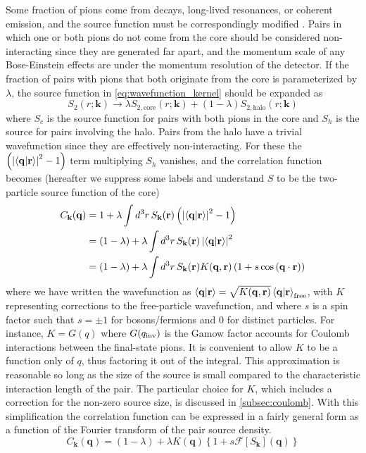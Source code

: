 Some fraction of pions come from decays, long-lived resonances, or coherent emission, and the source function must be correspondingly modified \cite{Bowler:1991vx,Sinyukov:1998fc}.
Pairs in which one or both pions do not come from the core should be considered non-interacting since they are generated far apart, and the momentum scale of any Bose-Einstein effects are under the momentum resolution of the detector.
If the fraction of pairs with pions that both originate from the core is parameterized by $\lambda$, the source function in \cref{eq:wavefunction_kernel} should be expanded as
\begin{equation} S_{2}(r;\mathbf{k}) \rightarrow \lambda S_{2,\textrm{core}} (r;\mathbf{k}) + (1-\lambda) S_{2,\textrm{halo}} (r;\mathbf{k}) \end{equation}
where $S_c$ is the source function for pairs with both pions in the core and $S_h$ is the source for pairs involving the halo.
Pairs from the halo have a trivial wavefunction since they are effectively non-interacting.
For these the $\left(\left|\braket{\mathbf{q}|\mathbf{r}}\right|^2 - 1\right)$ term multiplying $S_h$ vanishes, and the correlation function becomes (hereafter we suppress some labels and understand $S$ to be the two-particle source function of the core)
\begin{equation}
  \begin{split}
    C_\mathbf{k}(\mathbf{q}) &= 1 + \lambda \int d^3 r \, S_{\mathbf{k}}(\mathbf{r}) \left(\left|\braket{\mathbf{q}|\mathbf{r}}\right|^2 - 1 \right)\\
    &= (1-\lambda) + \lambda \int d^3 r \, S_{\mathbf{k}}(\mathbf{r}) \left|\braket{\mathbf{q}|\mathbf{r}}\right|^2\\
    &= (1-\lambda) + \lambda \int d^3 r \, S_{\mathbf{k}}(\mathbf{r}) K(\mathbf{q},\mathbf{r}) \left(1 + s \cos\left(\mathbf{q}\cdot\mathbf{r}\right)\right)
  \end{split}
\end{equation}
where we have written the wavefunction as $\braket{\mathbf{q}|\mathbf{r}} = \sqrt{K(\mathbf{q},\mathbf{r})} \braket{\mathbf{q}|\mathbf{r}}_{\textrm{free}}$, with $K$ representing corrections to the free-particle wavefunction, and where $s$ is a spin factor such that $s = \pm 1$ for bosons/fermions and $0$ for distinct particles.
For instance, $K = G(q)$ where $G(q_{\mathrm{inv}})$ is the Gamow factor accounts for Coulomb interactions between the final-state pions.
It is convenient to allow $K$ to be a function only of $q$, thus factoring it out of the integral.
This approximation is reasonable so long as the size of the source is small compared to the characteristic interaction length of the pair.
The particular choice for $K$, which includes a correction for the non-zero source size, is discussed in \cref{subsec:coulomb}.
With this simplification the correlation function can be expressed in a fairly general form as a function of the Fourier transform of the pair source density.
\begin{equation} \label{eq:correlation_function}
C_\mathbf{k}(\mathbf{q}) = (1-\lambda) + \lambda K(\mathbf{q})\left\{ 1 + s \mathcal{F} \left[ S_\mathbf{k} \right](\mathbf{q}) \right\}
\end{equation}



